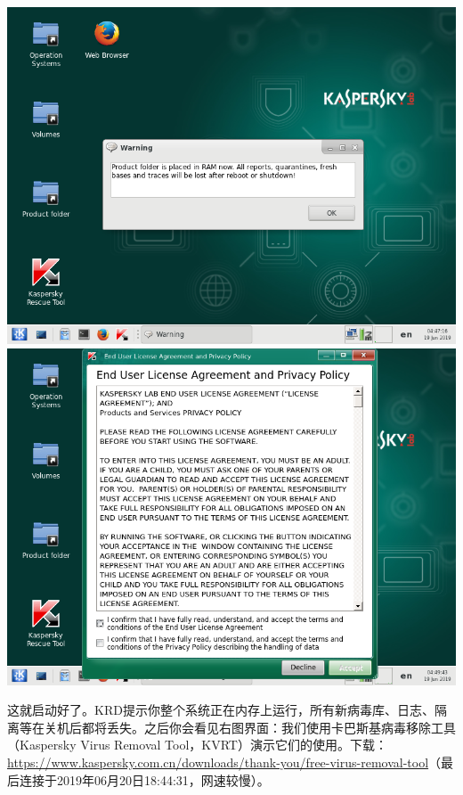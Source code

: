 \begin{center}
	\includegraphics[scale=0.35]{pic/krd4}	\includegraphics[scale=0.35]{pic/krd5}
\end{center} \par
这就启动好了。KRD提示你整个系统正在内存上运行，所有新病毒库、日志、隔离等在关机后都将丢失。之后你会看见右图界面：我们使用卡巴斯基病毒移除工具（Kaspersky Virus Removal Tool，KVRT）演示它们的使用。下载：\url{https://www.kaspersky.com.cn/downloads/thank-you/free-virus-removal-tool}（最后连接于2019年06月20日18:44:31，网速较慢）。
